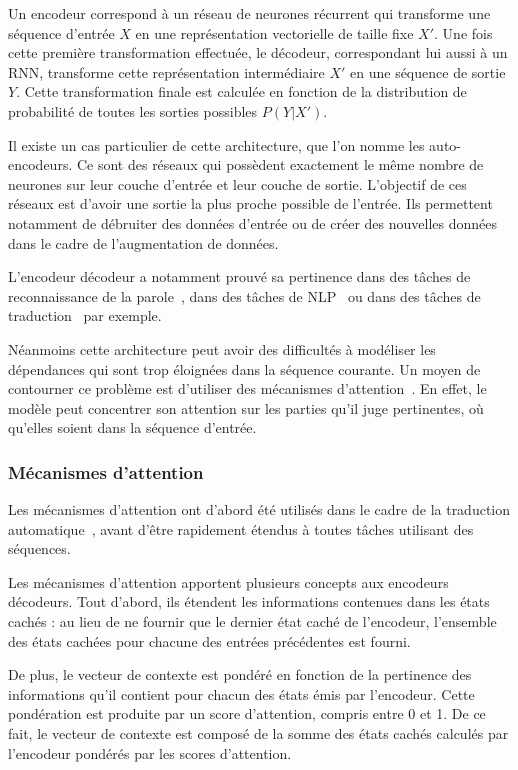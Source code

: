 Un encodeur correspond à un réseau de neurones récurrent qui transforme une séquence d'entrée $X$ en une représentation vectorielle de taille fixe $X'$. Une fois cette première transformation effectuée, le décodeur, correspondant lui aussi à un RNN, transforme cette représentation intermédiaire $X'$ en une séquence de sortie $Y$. Cette transformation finale est calculée en fonction de la distribution de probabilité de toutes les sorties possibles $P(Y|X')$.

Il existe un cas particulier de cette architecture, que l'on nomme les auto-encodeurs. Ce sont des réseaux qui possèdent exactement le même nombre de neurones sur leur couche d'entrée et leur couche de sortie. L'objectif de ces réseaux est d'avoir une sortie la plus proche possible de l'entrée. Ils permettent notamment de débruiter des données d'entrée ou de créer des nouvelles données dans le cadre de l'augmentation de données.

L'encodeur décodeur a notamment prouvé sa pertinence dans des tâches de reconnaissance de la parole~\cite{Chiu2018}, dans des tâches de NLP~\cite{Hu2019} ou dans des tâches de traduction~\cite{Cho2014} par exemple.

Néanmoins cette architecture peut avoir des difficultés à modéliser les dépendances qui sont trop éloignées dans la séquence courante. Un moyen de contourner ce problème est d'utiliser des mécanismes d'attention~\cite{Bahdanau2016}. En effet, le modèle peut concentrer son attention sur les parties qu'il juge pertinentes, où qu'elles soient dans la séquence d'entrée.

\subsubsection{Mécanismes d’attention}

Les mécanismes d'attention ont d'abord été utilisés dans le cadre de la traduction automatique~\cite{Luong2015}, avant d'être rapidement étendus à toutes tâches utilisant des séquences.

Les mécanismes d'attention apportent plusieurs concepts aux encodeurs décodeurs. Tout d'abord, ils étendent les informations contenues dans les états cachés : au lieu de ne fournir que le dernier état caché de l'encodeur, l'ensemble des états cachées pour chacune des entrées précédentes est fourni.

De plus, le vecteur de contexte est pondéré en fonction de la pertinence des informations qu'il contient pour chacun des états émis par l'encodeur. Cette pondération est produite par un score d'attention, compris entre 0 et 1. De ce fait, le vecteur de contexte est composé de la somme des états cachés calculés par l'encodeur pondérés par les scores d'attention.

